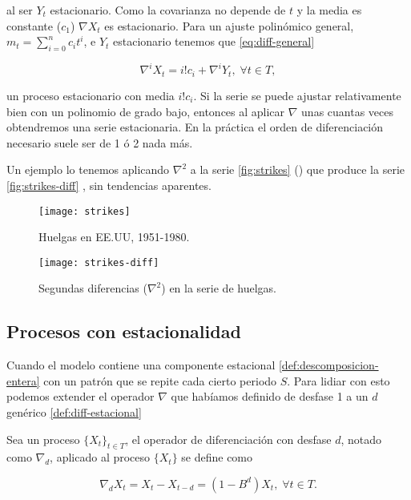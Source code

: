 al ser $Y_t$ estacionario. Como la covarianza no depende de $t$ y la media es constante ($c_1$) $\nabla X_t$ es estacionario. Para un ajuste polinómico general, $m_t = \sum \limits^n_{i = 0} c_i t^i$, e $Y_t$ estacionario tenemos que \eqref{eq:diff-general}

\begin{equation}
  \nabla^i X_t = i!c_i + \nabla^i Y_t, \; \forall t \in T,
  \label{eq:diff-general}
\end{equation}

un proceso estacionario con media $i!c_i$. Si la serie se puede ajustar relativamente bien con un polinomio de grado bajo, entonces al aplicar $\nabla$ unas cuantas veces obtendremos una serie estacionaria. En la práctica el orden de diferenciación necesario suele ser de 1 ó 2 nada más.

Un ejemplo lo tenemos aplicando $\nabla^2$ a la serie \autoref{fig:strikes} (\cite{brockwell2002introduction}) que produce la serie \autoref{fig:strikes-diff} \cite{brockwell2002introduction}, sin tendencias aparentes.

\begin{figure}[htpb]
  \centering
  \texttt{[image: strikes]}
  \caption{Huelgas en EE.UU, 1951-1980.}
  \label{fig:strikes}
\end{figure}


\begin{figure}[htpb]
  \centering
  \texttt{[image: strikes-diff]}
  \caption{Segundas diferencias ($\nabla^2$) en la serie de huelgas.}
  \label{fig:strikes-diff}
\end{figure}

\subsection{Procesos con estacionalidad}

Cuando el modelo contiene una componente estacional \autoref{def:descomposicion-entera} con un patrón que se repite cada cierto periodo $S$. Para lidiar con esto podemos extender el operador $\nabla$ que habíamos definido de desfase 1 a un $d$ genérico \autoref{def:diff-estacional}

\begin{definicion}
  Sea un proceso $\{X_t\}_{t \in T}$, el operador de diferenciación con desfase $d$, notado como $\nabla_d$, aplicado al proceso $\{X_t\}$ se define como

  $$\nabla_d X_t = X_t - X_{t - d} = (1 - B^d)X_t, \; \forall t \in T.$$
\label{def:diff-estacional}
\end{definicion}

